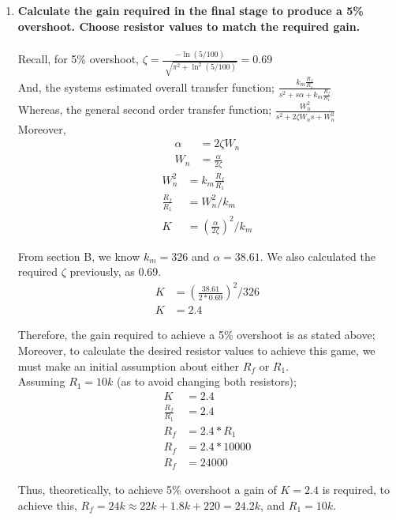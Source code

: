 \documentclass[11pt,a4paper]{article}
\begin{document}
\begin{enumerate}
    
    
    
    
    
    
    
    \pagebreak
	\item \textbf{Calculate the gain required in the final stage to produce a 5\% overshoot. Choose resistor values to match the required gain.} \\\\
    Recall, for 5\% overshoot, $\zeta = \frac{-\ln(5/100)}{\sqrt[]{\pi^2+\ln^2(5/100)}} = 0.69$\\
    And, the systems estimated overall transfer function; $\frac{k_m\frac{R_f}{R_1}}{s^2 + s\alpha + k_m\frac{R_f}{R_1}}$\\
    Whereas, the general second order transfer function; $\frac{W_n^2}{s^2 + 2\zeta W_n s + W_n^2}$\\
    Moreover, 
    \begin{align*}
	\alpha &= 2\zeta W_n\\
    W_n &= \frac{\alpha}{2\zeta}
	\end{align*}
    \begin{align*}
	W_n^2 &= k_m\frac{R_f}{R_1}\\
    \frac{R_f}{R_1} &= W_n^2/k_m\\
    K &= (\frac{\alpha}{2\zeta})^2/k_m
	\end{align*}
    
    From section B, we know $k_m = 326$ and $\alpha = 38.61$. We also calculated the required $\zeta$ previously, as 0.69. 
    \begin{align*}
    K &= (\frac{38.61}{2*0.69})^2/326\\
    K &= 2.4
	\end{align*}
    
    Therefore, the gain required to achieve a 5\% overshoot is as stated above; Moreover, to calculate the desired resistor values to achieve this game, we must make an initial assumption about either $R_f$ or $R_1$. \\
    Assuming $R_1 = 10k$ (as to avoid changing both resistors);
    \begin{align*}
    K &= 2.4 \\
    \frac{R_f}{R_1} &= 2.4 \\
    R_f &= 2.4*R_1 \\
    R_f &= 2.4*10 000 \\
    R_f &= 24 000 
	\end{align*}
    
    Thus, theoretically, to achieve 5\% overshoot a gain of $K = 2.4$ is required, to achieve this, $R_f = 24k \approx 22k + 1.8k + 220 = 24.2k$, and $R_1 = 10k$. 
    

\end{enumerate}
\end{document}

